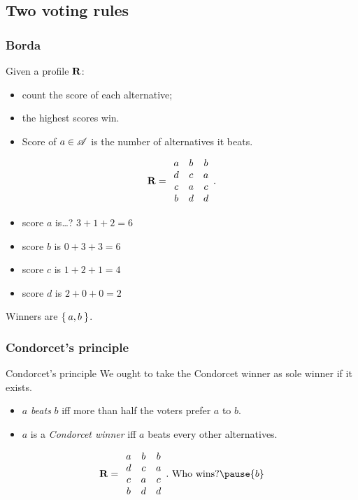 \documentclass[english]{beamer}
\begin{document}
\subsection{Two voting rules}
\begin{frame}
	\frametitle{Borda}
Given a profile $\mathbf{R}$:
	\begin{itemize}
		\item count the score of each alternative;
		\item the highest scores win.
		\item Score of $a \in \mathscr{A}$ is the number of alternatives it beats.
	\end{itemize}
	
	\begin{equation}
		\mathbf{R} =
		\begin{array}{ccc}
			a	&	b	&	b\\
			d	&	c	&	a\\
			c	&	a	&	c\\
			b	&	d	&	d
		\end{array}.
	\end{equation}
	\begin{minipage}{7cm}
		\begin{itemize}
			\item score $a$ is\dots? \pause $3 + 1 + 2 = 6$
			\item score $b$ is $0 + 3 + 3 = 6$
			\item score $c$ is $1 + 2 + 1 = 4$
			\item score $d$ is $2 + 0 + 0 = 2$
		\end{itemize}
	\end{minipage}%
	\begin{minipage}{4cm}
		Winners are $\Set{a, b}$.
	\end{minipage}
\end{frame}

\begin{frame}
	\frametitle{Condorcet’s principle}
	\begin{block}{Condorcet’s principle}
		We ought to take the Condorcet winner as sole winner if it exists.
		\begin{itemize}
			\item $a$ \emph{beats} $b$ iff more than half the voters prefer $a$ to $b$.
			\item $a$ is a \emph{Condorcet winner} iff $a$ beats every other alternatives.
		\end{itemize}
	\end{block}
	\vfill
	\begin{equation}
		\prof =
		\begin{array}{ccc}
			a	&	b	&	b\\
			d	&	c	&	a\\
			c	&	a	&	c\\
			b	&	d	&	d
		\end{array}.\text{ Who wins?}\pause {b}
	\end{equation}
\end{frame}
\end{document}
